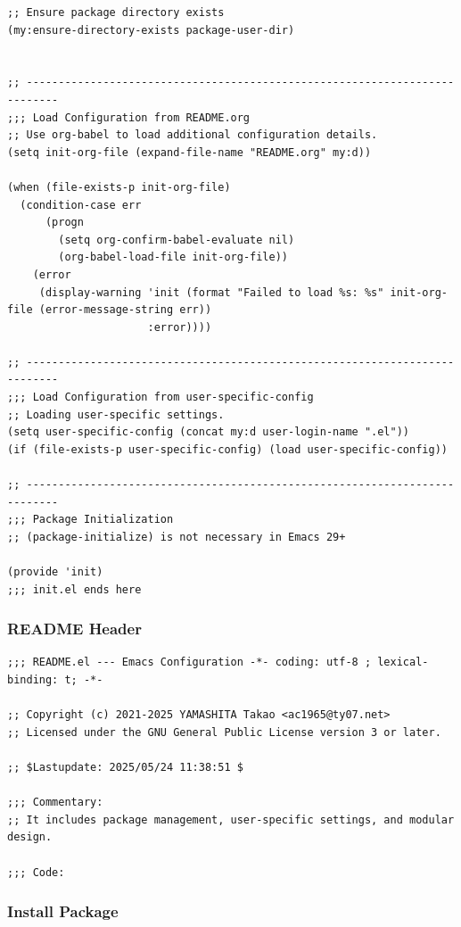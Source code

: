 \documentclass[11pt]{article}
\begin{document}
\begin{verbatim}
;; Ensure package directory exists
(my:ensure-directory-exists package-user-dir)


;; ---------------------------------------------------------------------------
;;; Load Configuration from README.org
;; Use org-babel to load additional configuration details.
(setq init-org-file (expand-file-name "README.org" my:d))

(when (file-exists-p init-org-file)
  (condition-case err
      (progn
        (setq org-confirm-babel-evaluate nil)
        (org-babel-load-file init-org-file))
    (error
     (display-warning 'init (format "Failed to load %s: %s" init-org-file (error-message-string err))
                      :error))))

;; ---------------------------------------------------------------------------
;;; Load Configuration from user-specific-config
;; Loading user-specific settings.
(setq user-specific-config (concat my:d user-login-name ".el"))
(if (file-exists-p user-specific-config) (load user-specific-config))

;; ---------------------------------------------------------------------------
;;; Package Initialization
;; (package-initialize) is not necessary in Emacs 29+

(provide 'init)
;;; init.el ends here
\end{verbatim}
\subsubsection{README Header}
\label{sec:org705c0c2}

\begin{verbatim}
;;; README.el --- Emacs Configuration -*- coding: utf-8 ; lexical-binding: t; -*-

;; Copyright (c) 2021-2025 YAMASHITA Takao <ac1965@ty07.net>
;; Licensed under the GNU General Public License version 3 or later.

;; $Lastupdate: 2025/05/24 11:38:51 $

;;; Commentary:
;; It includes package management, user-specific settings, and modular design.

;;; Code:
\end{verbatim}
\subsubsection{Install Package}
\label{sec:org3edb48c}
\end{document}
